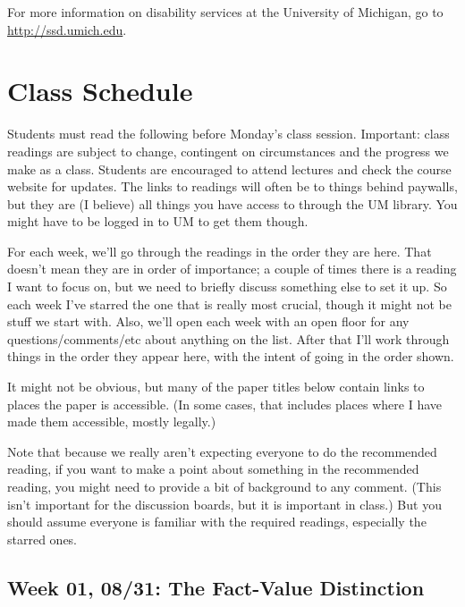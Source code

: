 \documentclass[
]{article}
\begin{document}
For more information on disability services at the University of
Michigan, go to \url{http://ssd.umich.edu}.

\newpage

\hypertarget{class-schedule}{%
\section{Class Schedule}\label{class-schedule}}

Students must read the following before Monday's class session.
Important: class readings are subject to change, contingent on
circumstances and the progress we make as a class. Students are
encouraged to attend lectures and check the course website for updates.
The links to readings will often be to things behind paywalls, but they
are (I believe) all things you have access to through the UM library.
You might have to be logged in to UM to get them though.

For each week, we'll go through the readings in the order they are here.
That doesn't mean they are in order of importance; a couple of times
there is a reading I want to focus on, but we need to briefly discuss
something else to set it up. So each week I've starred the one that is
really most crucial, though it might not be stuff we start with. Also,
we'll open each week with an open floor for any questions/comments/etc
about anything on the list. After that I'll work through things in the
order they appear here, with the intent of going in the order shown.

It might not be obvious, but many of the paper titles below contain
links to places the paper is accessible. (In some cases, that includes
places where I have made them accessible, mostly legally.)

Note that because we really aren't expecting everyone to do the
recommended reading, if you want to make a point about something in the
recommended reading, you might need to provide a bit of background to
any comment. (This isn't important for the discussion boards, but it is
important in class.) But you should assume everyone is familiar with the
required readings, especially the starred ones.

\hypertarget{week-01-0831-the-fact-value-distinction}{%
\subsection{Week 01, 08/31: The Fact-Value
Distinction}\label{week-01-0831-the-fact-value-distinction}}
\end{document}
